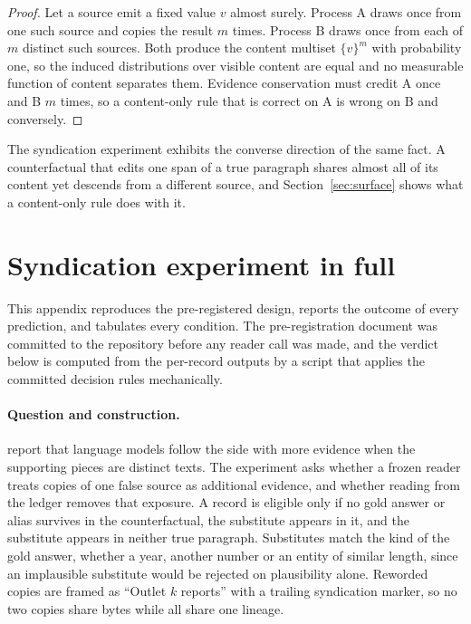 \documentclass{article}
\begin{document}
\begin{proof}
Let a source emit a fixed value $v$ almost surely. Process A draws once from
one such source and copies the result $m$ times. Process B draws once from each
of $m$ distinct such sources. Both produce the content multiset $\{v\}^m$ with
probability one, so the induced distributions over visible content are equal
and no measurable function of content separates them. Evidence conservation
must credit A once and B $m$ times, so a content-only rule that is correct on A
is wrong on B and conversely.
\end{proof}

The syndication experiment exhibits the converse direction of the same fact. A
counterfactual that edits one span of a true paragraph shares almost all of its
content yet descends from a different source, and Section~\ref{sec:surface}
shows what a content-only rule does with it.

\section{Syndication experiment in full}
\label{app:syndication}

This appendix reproduces the pre-registered design, reports the outcome of every
prediction, and tabulates every condition. The pre-registration document was
committed to the repository before any reader call was made, and the verdict
below is computed from the per-record outputs by a script that applies the
committed decision rules mechanically.

\paragraph{Question and construction.} \citet{xie2024chameleon} report that
language models follow the side with more evidence when the supporting pieces
are distinct texts. The experiment asks whether a frozen reader treats copies of
one false source as additional evidence, and whether reading from the ledger
removes that exposure. A record is eligible only if no gold answer or alias
survives in the counterfactual, the substitute appears in it, and the substitute
appears in neither true paragraph. Substitutes match the kind of the gold
answer, whether a year, another number or an entity of similar length, since an
implausible substitute would be rejected on plausibility alone. Reworded copies
are framed as ``Outlet $k$ reports'' with a trailing syndication marker, so no
two copies share bytes while all share one lineage.
\end{document}

